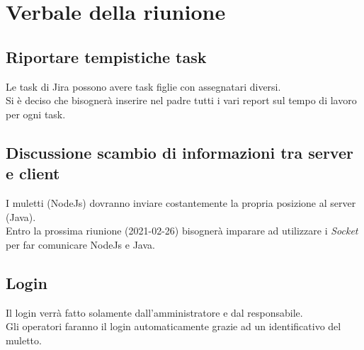 \section{Verbale della riunione}

\subsection{Riportare tempistiche task}
Le task di Jira possono avere task figlie con assegnatari diversi.\\
Si è deciso che bisognerà inserire nel padre tutti i vari report sul tempo di lavoro per ogni task.

\subsection{Discussione scambio di informazioni tra server e client}
I muletti (NodeJs) dovranno inviare costantemente la propria posizione al server (Java).\\
Entro la prossima riunione (2021-02-26) bisognerà imparare ad utilizzare i \textit{Socket} per far comunicare NodeJs e Java.

\subsection{Login}
Il login verrà fatto solamente dall'amministratore e dal responsabile.\\
Gli operatori faranno il login automaticamente grazie ad un identificativo del muletto.


